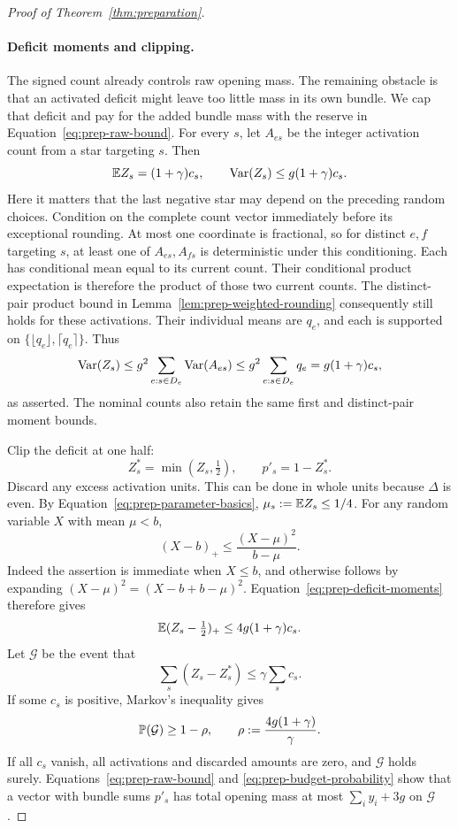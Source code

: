 \begin{proof}[Proof of Theorem~\ref{thm:preparation}]
\paragraph{Deficit moments and clipping.}
The signed count already controls raw opening mass. The remaining
obstacle is that an activated deficit might leave too little mass in its
own bundle. We cap that deficit and pay for the added bundle mass with
the reserve in Equation~\ref{eq:prep-raw-bound}.
For every $s$, let $A_{es}$ be the integer activation count from a star
targeting $s$.  Then
\begin{equation}\label{eq:prep-deficit-moments}
 \mathbb E Z_s=(1+\gamma)c_s,
 \qquad \operatorname{Var}(Z_s)\le g(1+\gamma)c_s.
\end{equation}
Here it matters that the last negative star may depend on the preceding
random choices.  Condition on the complete count vector immediately
before its exceptional rounding.  At most one coordinate is
fractional, so for distinct $e,f$ targeting $s$, at least one of
$A_{es},A_{fs}$ is deterministic under this conditioning.  Each has
conditional mean equal to its current count.  Their conditional product
expectation is therefore the product of those two current counts.
The distinct-pair product bound in
Lemma~\ref{lem:prep-weighted-rounding} consequently still holds for
these activations.  Their individual means are $q_e$, and each is
supported on $\{\lfloor q_e\rfloor,\lceil q_e\rceil\}$.  Thus
\[
 \operatorname{Var}(Z_s)
 \le g^2\sum_{e:s\in D_e}\operatorname{Var}(A_{es})
 \le g^2\sum_{e:s\in D_e}q_e
 =g(1+\gamma)c_s,
\]
as asserted.  The nominal counts also retain the same first and
distinct-pair moment bounds.

Clip the deficit at one half:
\[
 Z_s^*=\min(Z_s,\tfrac12),\qquad p'_s=1-Z_s^*.
\]
Discard any excess activation units.  This can be done in whole units
because $\Delta$ is even.  By Equation~\ref{eq:prep-parameter-basics},
$\mu_s:=\mathbb E Z_s\le1/4$.  For any random variable $X$ with mean $\mu<b$,
\[
 (X-b)_+\le\frac{(X-\mu)^2}{b-\mu}.
\]
Indeed the assertion is immediate when $X\le b$, and otherwise follows
by expanding $(X-\mu)^2=(X-b+b-\mu)^2$.
Equation~\ref{eq:prep-deficit-moments} therefore gives
\[
 \mathbb E(Z_s-\tfrac12)_+\le4g(1+\gamma)c_s.
\]
Let $\mathcal G$ be the event that
\[
 \sum_s(Z_s-Z_s^*)\le\gamma\sum_s c_s.
\]
If some $c_s$ is positive, Markov's inequality gives
\begin{equation}\label{eq:prep-budget-probability}
 \mathbb P(\mathcal G)\ge1-\rho,
 \qquad \rho:=\frac{4g(1+\gamma)}\gamma.
\end{equation}
If all $c_s$ vanish, all activations and discarded amounts are zero,
and $\mathcal G$ holds surely.  Equations~\ref{eq:prep-raw-bound} and
\ref{eq:prep-budget-probability} show that a vector with bundle sums
$p'_s$ has total opening mass at most $\sum_i y_i+3g$ on $\mathcal G$.


\end{proof}
